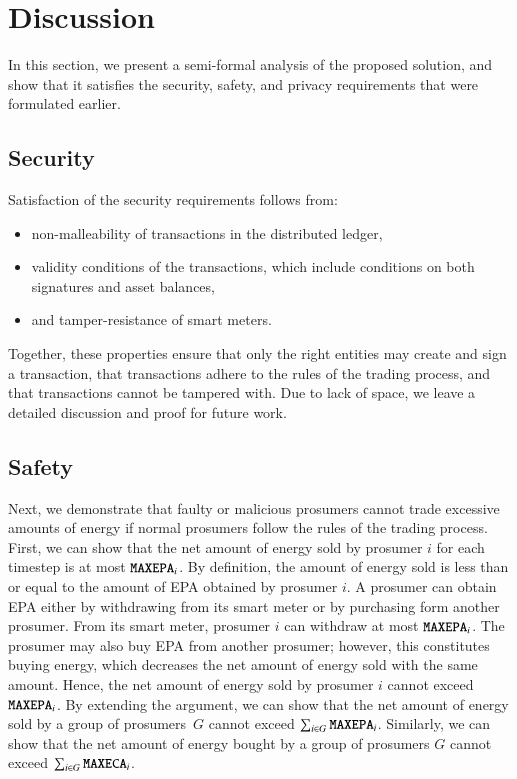 \section{Discussion}
\label{sec:discussion}

In this section, we present a semi-formal analysis of the proposed solution, and show that it satisfies the security, safety, and privacy requirements that were formulated earlier.

\subsection{Security}
Satisfaction of the security requirements follows from:
\begin{itemize}[noitemsep,topsep=-\parskip]
\item non-malleability of transactions in the distributed ledger,
\item validity conditions of the transactions, which include conditions on both signatures and asset balances,
\item and tamper-resistance of smart meters.
\end{itemize}
Together, these properties ensure that only the right entities may create and sign a transaction, that transactions adhere to the rules of the trading process, and that transactions cannot be tampered with.
Due to lack of space, we leave a detailed discussion and proof for future work.

\subsection{Safety}
Next, we demonstrate that faulty or malicious prosumers cannot trade excessive amounts of energy if normal prosumers follow the rules of the trading process. 
%
First, we can show that the net amount of energy sold by prosumer $i$ for each timestep is at most $\texttt{MAXEPA}_i$.
By definition, the amount of energy sold is less than or equal to the amount of EPA obtained by prosumer $i$.
A prosumer can obtain EPA either by withdrawing from its smart meter or by purchasing form another prosumer.
From its smart meter, prosumer $i$ can withdraw at most $\texttt{MAXEPA}_i$. %
The prosumer may also buy EPA from another prosumer; however, this constitutes buying energy, which decreases the net amount of energy sold with the same amount.
Hence, the net amount of energy sold by prosumer $i$ cannot exceed $\texttt{MAXEPA}_i$.
By extending the argument, we can show that the net amount of energy sold by a group of prosumers~$G$ cannot exceed $\sum_{i \in G} \texttt{MAXEPA}_i$.
Similarly, we can show that the net amount of energy bought by a group of prosumers $G$ cannot exceed $\sum_{i \in G} \texttt{MAXECA}_i$.

